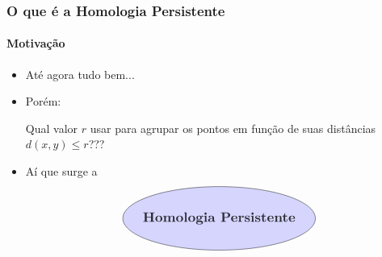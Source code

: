 \documentclass[11pt]{beamer}
\theoremstyle{remark}
\theoremstyle{definition}
\theoremstyle{plain}
\begin{document}
    \begin{frame}
        \frametitle{O que é a Homologia Persistente}
        \framesubtitle{Motivação}

        \begin{itemize}
            \item
                Até agora tudo bem...

            \item
                Porém:

                \begin{center}
                    Qual valor $r$ usar para agrupar os pontos em função
                    de suas distâncias $d(x,y) \leq r$???
                \end{center}

            \item
                Aí que surge a 
                \[
                \begin{tikzpicture}
                    \draw[fill=blue!20!white, opacity=0.8]
                        (0,0) ellipse (3cm and 1cm) node[midway, scale=1.2] 
                        {\textbf{Homologia Persistente}};
                \end{tikzpicture}
                \]

        \end{itemize}

    \end{frame}
\end{document}
